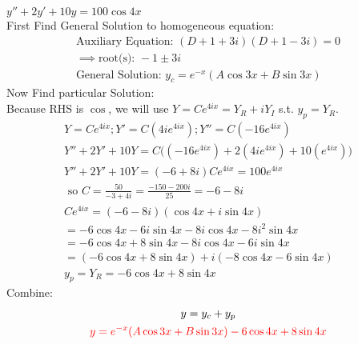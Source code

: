 \item [11.] $y''+2y'+10y=100\cos{4x}$\\[2mm]
First Find General Solution to homogeneous equation:
\begin{gather*}
    \text{Auxiliary Equation: } (D+1+3i)(D+1-3i)=0\\
    \implies \text{root(s): } -1 \pm 3i\\
    \text{General Solution: } y_c=e^{-x}(A\cos{3x}+B\sin{3x})
\end{gather*}
Now Find particular Solution:\\
Because RHS is $\cos$, we will use $Y=Ce^{4ix}=Y_R+iY_I$ s.t. $y_p=Y_R$. 
\begin{gather*}
    Y=Ce^{4ix}; Y'=C(4ie^{4ix});Y''=C(-16e^{4ix})\\
    Y''+2Y'+10Y = C
    \big(
    (-16e^{4ix})
    +2(4ie^{4ix})
    +10(e^{4ix})
    \big)\\
    Y''+2Y'+10Y=(-6+8i)Ce^{4ix}=100e^{4ix}\\
    \text{ so } C=\frac{50}{-3+4i}=\frac{-150-200i}{25}=-6-8i\\
    Ce^{4ix}=(-6-8i)(\cos{4x}+i\sin{4x})\\
    = -6\cos{4x}-6i\sin{4x}-8i\cos{4x}-8i^2\sin{4x}\\
    = -6\cos{4x}+8\sin{4x}-8i\cos{4x}-6i\sin{4x}\\
    = (-6\cos{4x}+8\sin{4x})+i(-8\cos{4x}-6\sin{4x})\\
    y_p = Y_R = -6\cos{4x}+8\sin{4x}
\end{gather*}
Combine:
\begin{gather*}
    y=y_c+y_p\\
    \textcolor{red}{y = e^{-x}(A\cos{3x}+B\sin{3x})-6\cos{4x}+8\sin{4x}}
\end{gather*}